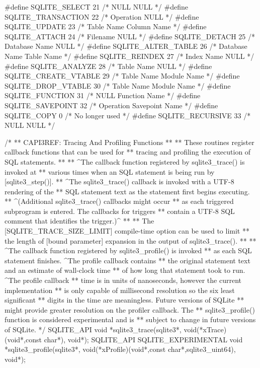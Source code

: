 \begin{Codex}[label=sqlite3.h,numbers=left]
{#define SQLITE_SELECT               21   /* NULL            NULL            */
#define SQLITE_TRANSACTION          22   /* Operation       NULL            */
#define SQLITE_UPDATE               23   /* Table Name      Column Name     */
#define SQLITE_ATTACH               24   /* Filename        NULL            */
#define SQLITE_DETACH               25   /* Database Name   NULL            */
#define SQLITE_ALTER_TABLE          26   /* Database Name   Table Name      */
#define SQLITE_REINDEX              27   /* Index Name      NULL            */
#define SQLITE_ANALYZE              28   /* Table Name      NULL            */
#define SQLITE_CREATE_VTABLE        29   /* Table Name      Module Name     */
#define SQLITE_DROP_VTABLE          30   /* Table Name      Module Name     */
#define SQLITE_FUNCTION             31   /* NULL            Function Name   */
#define SQLITE_SAVEPOINT            32   /* Operation       Savepoint Name  */
#define SQLITE_COPY                  0   /* No longer used */
#define SQLITE_RECURSIVE            33   /* NULL            NULL            */

/*
** CAPI3REF: Tracing And Profiling Functions
**
** These routines register callback functions that can be used for
** tracing and profiling the execution of SQL statements.
**
** ^The callback function registered by sqlite3_trace() is invoked at
** various times when an SQL statement is being run by [sqlite3_step()].
** ^The sqlite3_trace() callback is invoked with a UTF-8 rendering of the
** SQL statement text as the statement first begins executing.
** ^(Additional sqlite3_trace() callbacks might occur
** as each triggered subprogram is entered.  The callbacks for triggers
** contain a UTF-8 SQL comment that identifies the trigger.)^
**
** The [SQLITE_TRACE_SIZE_LIMIT] compile-time option can be used to limit
** the length of [bound parameter] expansion in the output of sqlite3_trace().
**
** ^The callback function registered by sqlite3_profile() is invoked
** as each SQL statement finishes.  ^The profile callback contains
** the original statement text and an estimate of wall-clock time
** of how long that statement took to run.  ^The profile callback
** time is in units of nanoseconds, however the current implementation
** is only capable of millisecond resolution so the six least significant
** digits in the time are meaningless.  Future versions of SQLite
** might provide greater resolution on the profiler callback.  The
** sqlite3_profile() function is considered experimental and is
** subject to change in future versions of SQLite.
*/
SQLITE_API void *sqlite3_trace(sqlite3*, void(*xTrace)(void*,const char*), void*);
SQLITE_API SQLITE_EXPERIMENTAL void *sqlite3_profile(sqlite3*,
   void(*xProfile)(void*,const char*,sqlite3_uint64), void*);

}
\end{Codex}
